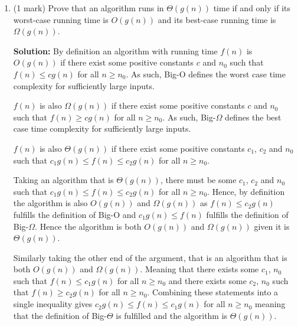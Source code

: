 \documentclass[a4,13pt]{extarticle}
\newenvironment{Solution}{\color{blue}\textbf{Solution:}}{}
\begin{document}
\begin{enumerate}
\begin{enumerate}
			\begin{Solution}
				Tight Big-O and Big-$\Omega$ represent the worst case time complexity and best case time complexity, respectively. This is not exactly the same as runtime and instead simply provides a class for the algorithm. The runtime could be better or worse than the Big-O and Big-$\Omega$ time complexity due to constants and other factors.
				
				Furthermore, while a tight Big-O and Big-$\Omega$ bound can represent the worst case and best case respectively, it is possible for non-tight bounds to exist. For example, all algorithms can be said to be $\Omega(1)$, however that does not mean they ever actually run with that time complexity. 
			\end{Solution}
			  
			\medskip
	      	      	      	                  
	      	\item (1 mark) Prove that an algorithm runs in $\Theta (g(n))$ time if and only if its worst-case running time is $O(g(n))$ and its best-case running time is $\Omega(g(n))$.
	      	      
			\begin{Solution}
				By definition an algorithm with running time $f(n)$ is $O(g(n))$ if there exist some positive constants $c$ and $n_0$ such that $f(n) \leq cg(n)$ for all $n \geq n_0$. As such, Big-O defines the worst case time complexity for sufficiently large inputs.
				
				$f(n)$ is also $\Omega(g(n))$ if there exist some positive constants $c$ and $n_0$ such that $f(n) \geq cg(n)$ for all $n \geq n_0$. As such, Big-$\Omega$ defines the best case time complexity for sufficiently large inputs.

				$f(n)$ is also $\Theta(g(n))$ if there exist some positive constants $c_1$, $c_2$ and $n_0$ such that $c_1g(n) \leq f(n)\leq c_2g(n)$ for all $n \geq n_0$.

				Taking an algorithm that is $\Theta(g(n))$, there must be some $c_1$, $c_2$ and $n_0$ such that $c_1g(n) \leq f(n) \leq c_2g(n)$ for all $n \geq n_0$. Hence, by definition the algorithm is also $O(g(n))$ and $\Omega(g(n))$ as $f(n) \leq c_2g(n)$ fulfills the definition of Big-O and $c_1g(n) \leq f(n)$ fulfills the definition of Big-$\Omega$. Hence the algorithm is both $O(g(n))$ and $\Omega(g(n))$ given it is $\Theta(g(n))$.

				Similarly taking the other end of the argument, that is an algorithm that is both $O(g(n))$ and $\Omega(g(n))$. Meaning that there exists some $c_1$, $n_0$ such that $f(n) \leq c_1g(n)$ for all $n \geq n_0$ and there exists some $c_2$, $n_0$ such that $f(n) \geq c_2g(n)$ for all $n \geq n_0$. Combining these statements into a single inequality gives $c_2g(n) \leq f(n) \leq c_1g(n)$ for all $n \geq n_0$ meaning that the definition of Big-$\Theta$ is fulfilled and the algorithm is $\Theta(g(n))$.


\end{Solution}
\end{enumerate}
\end{enumerate}
\end{document}
